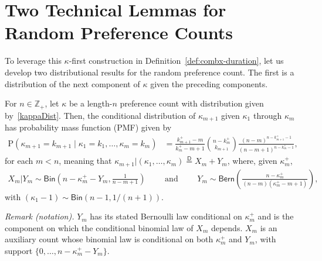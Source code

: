\documentclass[opre,nonblindrev]{informs3_no_remark}
\newcommand{\PP}[1]{\mathrm{P}\left( #1 \right)}
\begin{document}
\section{Two Technical Lemmas for Random Preference Counts}\label{lemmaSec}

To leverage this $\kappa$-first construction in Definition~\ref{def:combx-duration}, let us develop two distributional results for the random preference count. The first is a distribution of the next component of $\kappa$ given the preceding components.

\begin{lemma}\label{kappaCPMF1}
For $n \in \mathbb{Z}_+$, let $\kappa$ be a length-$n$ preference count with distribution given by~\eqref{kappaDist}. Then, the conditional distribution of $\kappa_{m+1}$ given $\kappa_1$ through $\kappa_m$ has probability mass function (PMF) given by
\begin{align}
\PP{\kappa_{m+1} = k_{m+1} \mid \kappa_1 = k_1, \dots, \kappa_m = k_m}
&=
\frac{k_{m+1}^+ - m}{k_m^+ - m + 1}
{n - k_m^+ \choose k_{m+1}}
\frac{\left(n-m\right)^{n-k_{m+1}^+-1}}{(n-m+1)^{n-k_m^+-1}}
,
\end{align}
for each $m < n$, meaning that $\kappa_{m+1} | (\kappa_1, \dots, \kappa_m) \stackrel{\mathsf{D}}{=} X_m + Y_m$, where, given $\kappa_m^+$,
\begin{align}
X_m | Y_m
\sim 
\mathsf{Bin}\left(
n - \kappa_m^+ - Y_m
,
\frac{1}{n-m+1}
\right)
\qquad
\text{ and }
\qquad
Y_m \sim 
\mathsf{Bern}\left(\frac{n-\kappa_m^+}{(n-m)(\kappa_m^+ - m + 1)} \right)
,
\end{align}
with $(\kappa_1 - 1) \sim \mathsf{Bin}\left(n-1, 1/(n+1)\right)$.
\end{lemma}

\noindent\textit{Remark (notation).} $Y_m$ has its stated Bernoulli law conditional on $\kappa_m^+$ and is the component on which the conditional binomial law of $X_m$ depends. $X_m$ is an auxiliary count whose binomial law is conditional on both $\kappa_m^+$ and $Y_m$, with support $\{0,\dots,n-\kappa_m^+-Y_m\}$.
\end{document}
